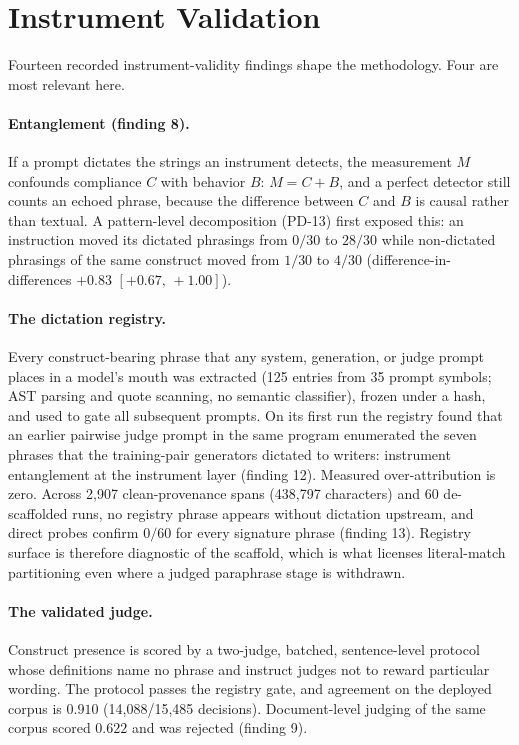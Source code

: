 \documentclass[11pt]{article}
\newcommand{\ci}[2]{\ensuremath{[#1,\,#2]}}
\begin{document}
\section{Instrument Validation}
\label{sec:instruments}

Fourteen recorded instrument-validity findings shape the methodology.
Four are most relevant here.

\paragraph{Entanglement (finding 8).} If a prompt dictates the strings
an instrument detects, the measurement $M$ confounds compliance $C$
with behavior $B$: $M = C + B$, and a perfect detector still counts an
echoed phrase, because the difference between $C$ and $B$ is causal
rather than textual. A pattern-level decomposition (PD-13) first
exposed this: an instruction moved its dictated phrasings from $0/30$
to $28/30$ while non-dictated phrasings of the same construct moved
from $1/30$ to $4/30$ (difference-in-differences $+0.83$
\ci{+0.67}{+1.00}).

\paragraph{The dictation registry.} Every construct-bearing phrase that
any system, generation, or judge prompt places in a model's mouth was
extracted (125 entries from 35 prompt symbols; AST parsing and quote
scanning, no semantic classifier), frozen under a hash, and used to
gate all subsequent prompts. On its first run the registry found that
an earlier pairwise judge prompt in the same program enumerated the
seven phrases that the training-pair generators dictated to writers:
instrument entanglement at the instrument layer (finding 12). Measured
over-attribution is zero. Across 2{,}907 clean-provenance spans
(438{,}797 characters) and 60 de-scaffolded runs, no registry phrase
appears without dictation upstream, and direct probes confirm $0/60$
for every signature phrase (finding 13). Registry surface is therefore
diagnostic of the scaffold, which is what licenses literal-match
partitioning even where a judged paraphrase stage is withdrawn.

\paragraph{The validated judge.} Construct presence is scored by a
two-judge, batched, sentence-level protocol whose definitions name no
phrase and instruct judges not to reward particular wording. The
protocol passes the registry gate, and agreement on the deployed corpus
is $0.910$ (14{,}088/15{,}485 decisions). Document-level judging of the
same corpus scored $0.622$ and was rejected (finding 9).
\end{document}
